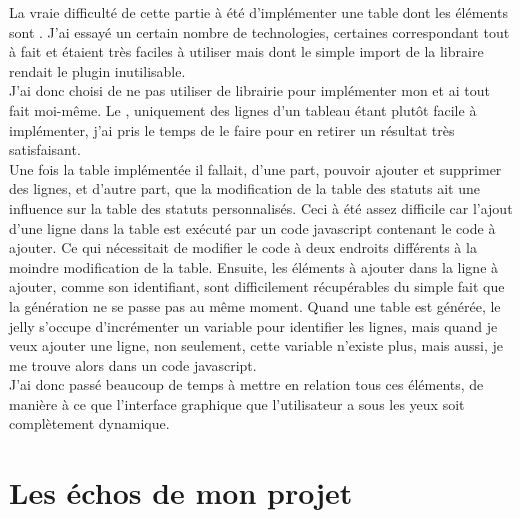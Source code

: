 La vraie difficulté de cette partie à été d'implémenter une table dont les éléments sont . J'ai essayé un certain nombre de technologies, certaines correspondant tout à fait et étaient très faciles à utiliser mais dont le simple import de la libraire rendait le plugin inutilisable.\\
J'ai donc choisi de ne pas utiliser de librairie pour implémenter mon  et ai tout fait moi-même. Le , uniquement des lignes d'un tableau étant plutôt facile à implémenter, j'ai pris le temps de le faire pour en retirer un résultat très satisfaisant.\\
Une fois la table implémentée il fallait, d'une part, pouvoir ajouter et supprimer des lignes, et d'autre part, que la modification de la table des statuts ait une influence sur la table des statuts personnalisés. Ceci à été assez difficile car l'ajout d'une ligne dans la table est exécuté par un code javascript contenant le code à ajouter. Ce qui nécessitait de modifier le code à deux endroits différents à la moindre modification de la table. Ensuite, les éléments à ajouter dans la ligne à ajouter, comme son identifiant, sont difficilement récupérables du simple fait que la génération ne se passe pas au même moment. Quand une table est générée, le jelly s'occupe d'incrémenter un variable pour identifier les lignes, mais quand je veux ajouter une ligne, non seulement, cette variable n'existe plus, mais aussi, je me trouve alors dans un code javascript.\\
J'ai donc passé beaucoup de temps à mettre en relation tous ces éléments, de manière à ce que l'interface graphique que l'utilisateur a sous les yeux soit complètement dynamique.










\section{Les échos de mon projet}


